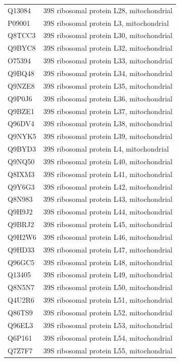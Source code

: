 \documentclass[10pt,twoside]{article}
\begin{document}
\begin{longtable}{lL{0.75\textwidth}}
Q13084	&	39S ribosomal protein L28, mitochondrial 	\\
P09001	&	39S ribosomal protein L3, mitochondrial 	\\
Q8TCC3	&	39S ribosomal protein L30, mitochondrial 	\\
Q9BYC8	&	39S ribosomal protein L32, mitochondrial 	\\
O75394	&	39S ribosomal protein L33, mitochondrial 	\\
Q9BQ48	&	39S ribosomal protein L34, mitochondrial 	\\
Q9NZE8	&	39S ribosomal protein L35, mitochondrial 	\\
Q9P0J6	&	39S ribosomal protein L36, mitochondrial 	\\
Q9BZE1	&	39S ribosomal protein L37, mitochondrial 	\\
Q96DV4	&	39S ribosomal protein L38, mitochondrial 	\\
Q9NYK5	&	39S ribosomal protein L39, mitochondrial 	\\
Q9BYD3	&	39S ribosomal protein L4, mitochondrial 	\\
Q9NQ50	&	39S ribosomal protein L40, mitochondrial 	\\
Q8IXM3	&	39S ribosomal protein L41, mitochondrial 	\\
Q9Y6G3	&	39S ribosomal protein L42, mitochondrial 	\\
Q8N983	&	39S ribosomal protein L43, mitochondrial 	\\
Q9H9J2	&	39S ribosomal protein L44, mitochondrial 	\\
Q9BRJ2	&	39S ribosomal protein L45, mitochondrial 	\\
Q9H2W6	&	39S ribosomal protein L46, mitochondrial 	\\
Q9HD33	&	39S ribosomal protein L47, mitochondrial 	\\
Q96GC5	&	39S ribosomal protein L48, mitochondrial 	\\
Q13405	&	39S ribosomal protein L49, mitochondrial 	\\
Q8N5N7	&	39S ribosomal protein L50, mitochondrial 	\\
Q4U2R6	&	39S ribosomal protein L51, mitochondrial 	\\
Q86TS9	&	39S ribosomal protein L52, mitochondrial 	\\
Q96EL3	&	39S ribosomal protein L53, mitochondrial 	\\
Q6P161	&	39S ribosomal protein L54, mitochondrial 	\\
Q7Z7F7	&	39S ribosomal protein L55, mitochondrial 	\\

\end{longtable}
\end{document}
